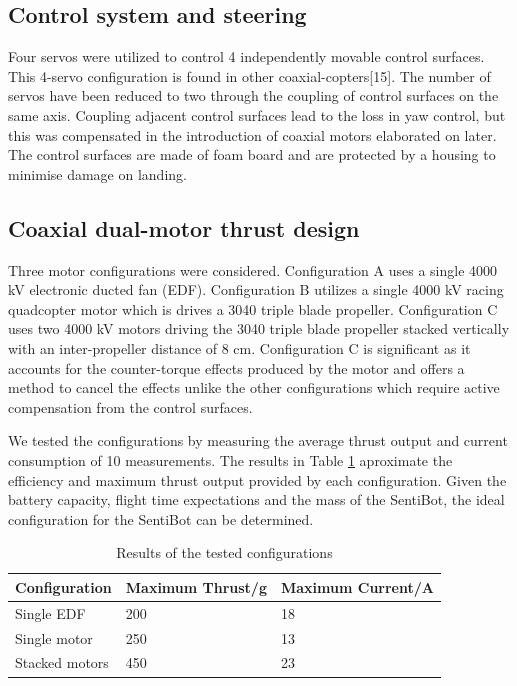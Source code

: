 \documentclass[12pt]{article}
\begin{document}
\subsection{Control system and steering}

Four servos were utilized to control 4 independently movable control surfaces. This 4-servo configuration is found in other coaxial-copters[15]. The number of servos have been reduced to two through the coupling of control surfaces on the same axis. Coupling adjacent control surfaces lead to the loss in yaw control, but this was compensated in the introduction of coaxial motors elaborated on later. The control surfaces are made of foam board and are protected by a housing to minimise damage on landing. 

\subsection{Coaxial dual-motor thrust design}

Three motor configurations were considered. Configuration A uses a single 4000 kV electronic ducted fan (EDF).  Configuration B utilizes a single 4000 kV racing quadcopter motor which is drives a 3040 triple blade propeller. Configuration C uses two 4000 kV motors driving the 3040 triple blade propeller stacked vertically with an inter-propeller distance of 8 cm. Configuration C is significant as it accounts for the counter-torque effects produced by the motor and offers a method to cancel the effects unlike the other configurations which require active compensation from the control surfaces.

We tested the configurations by measuring the average thrust output and current consumption of 10 measurements. The results in Table \ref{tab:configs} aproximate the efficiency and maximum thrust output provided by each configuration. Given the battery capacity, flight time expectations and the mass of the SentiBot, the ideal configuration for the SentiBot can be determined.

\begin{table}[h]
	\centering
	\begin{tabular}{ | l | l | l | }
		Configuration & Maximum Thrust/g & Maximum Current/A \\
		\hline
		Single EDF & 200 & 18 \\
		Single motor & 250 & 13 \\
		Stacked motors & 450 & 23 \\
	\end{tabular}
	\caption{Results of the tested configurations}
	\label{tab:configs}
\end{table}
\end{document}
